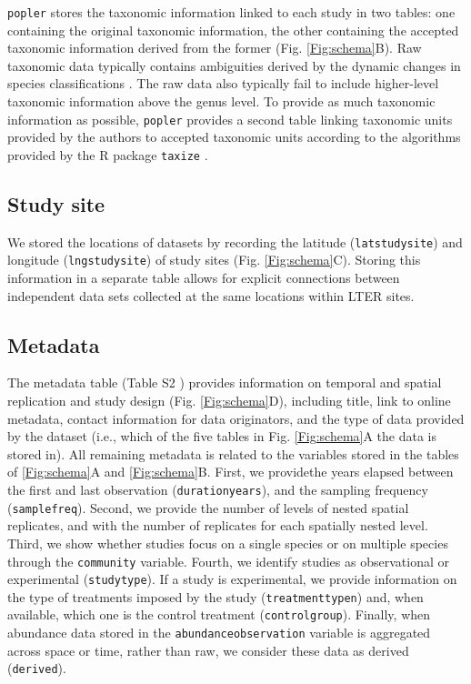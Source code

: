 \documentclass{article}\usepackage[]{graphicx}\usepackage[]{color}
\newcommand{\tom}[1]{{\textit{\color{red}{[#1]}}}}
\begin{document}
\texttt{popler} stores the taxonomic information linked to each study in two tables: one containing the original taxonomic information, the other containing the accepted taxonomic information derived from the former (Fig. \ref{Fig:schema}B). Raw taxonomic data typically contains ambiguities derived by the dynamic changes in species classifications \citep{Chamberlain2013}. The raw data also typically fail to include higher-level taxonomic information above the genus level. To provide as much taxonomic information as possible, \texttt{popler} provides a second table linking taxonomic units provided by the authors to accepted taxonomic units according to the algorithms provided by the R package \texttt{taxize} \citep{Chamberlain2013}. \tom{Just want to confirm that we are definitely doing this??}

\subsection*{Study site}
We stored the locations of datasets by recording the latitude (\texttt{lat\textunderscore study\textunderscore site}) and longitude (\texttt{lng\textunderscore study\textunderscore site}) of study sites (Fig. \ref{Fig:schema}C). Storing this information in a separate table allows for explicit connections between independent data sets collected at the same locations within LTER sites. 

\subsection*{Metadata}
The metadata table (Table S2 \tom{Confusing because this table does not have 48 variables}) provides information on temporal and spatial replication and study design (Fig. \ref{Fig:schema}D), including title, link to online metadata, contact information for data originators, and the type of data provided by the dataset (i.e., which of the five tables in Fig. \ref{Fig:schema}A the data is stored in). All remaining metadata is related to the variables stored in the tables of \ref{Fig:schema}A and \ref{Fig:schema}B. First, we providethe years elapsed between the first and last observation (\texttt{duration\textunderscore years}), and the sampling frequency (\texttt{samplefreq}). Second, we provide the number of levels of nested spatial replicates, and with the number of replicates for each spatially nested level. Third, we show whether studies focus on a single species or on multiple species through the \texttt{community} variable. Fourth, we identify studies as observational or experimental (\texttt{studytype}). If a study is experimental, we provide information on the type of treatments imposed by the study (\texttt{treatment\textunderscore type\textunderscore n}) and, when available, which one is the control treatment (\texttt{control\textunderscore group}). Finally, when abundance data stored in the \texttt{abundance\textunderscore observation} variable is aggregated across space or time, rather than raw, we consider these data as derived (\texttt{derived}).
\end{document}
